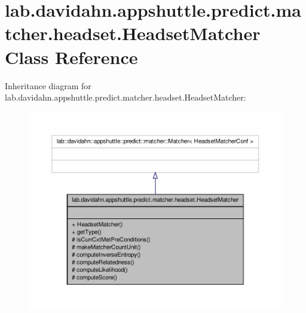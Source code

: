 \hypertarget{classlab_1_1davidahn_1_1appshuttle_1_1predict_1_1matcher_1_1headset_1_1_headset_matcher}{\section{lab.\-davidahn.\-appshuttle.\-predict.\-matcher.\-headset.\-Headset\-Matcher \-Class \-Reference}
\label{classlab_1_1davidahn_1_1appshuttle_1_1predict_1_1matcher_1_1headset_1_1_headset_matcher}
}


\-Inheritance diagram for lab.\-davidahn.\-appshuttle.\-predict.\-matcher.\-headset.\-Headset\-Matcher\-:
\nopagebreak
\begin{figure}[H]
\begin{center}
\leavevmode
\includegraphics[width=350pt]{classlab_1_1davidahn_1_1appshuttle_1_1predict_1_1matcher_1_1headset_1_1_headset_matcher__inherit__graph}
\end{center}
\end{figure}



